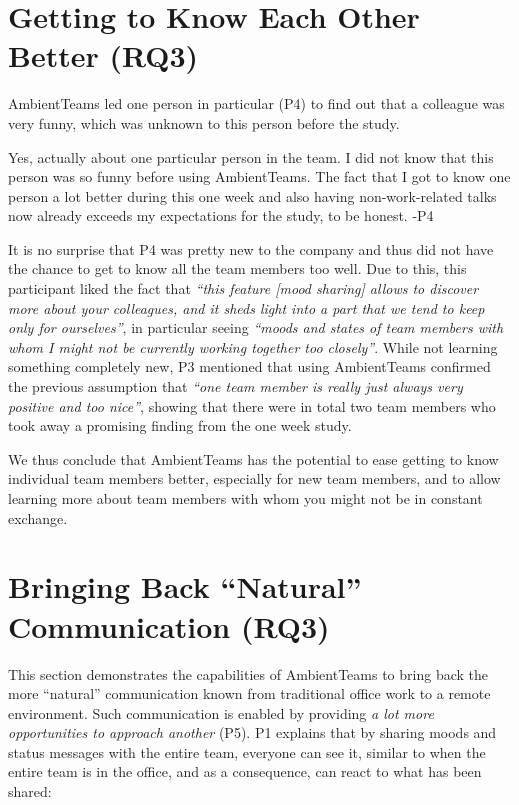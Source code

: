 \section{Getting to Know Each Other Better (RQ3)}
\label{section:getting_to_know_each_other_better}
AmbientTeams led one person in particular (P4) to find out that a colleague was very funny, which was unknown to this person before the study.

\begin{displayquote}
    Yes, actually about one particular person in the team. I did not know that this person was so funny before using AmbientTeams. The fact that I got to know one person a lot better during this one week and also having non-work-related talks now already exceeds my expectations for the study, to be honest. -P4
\end{displayquote}

It is no surprise that P4 was pretty new to the company and thus did not have the chance to get to know all the team members too well. Due to this, this participant liked the fact that \textit{\enquote{this feature [mood sharing] allows to discover more about your colleagues, and it sheds light into a part that we tend to keep only for ourselves}}, in particular seeing \textit{\enquote{moods and states of team members with whom I might not be currently working together too closely}}.  While not learning something completely new, P3 mentioned that using AmbientTeams confirmed the previous assumption that \textit{\enquote{one team member is really just always very positive and too nice}}, showing that there were in total two team members who took away a promising finding from the one week study.

We thus conclude that AmbientTeams has the potential to ease getting to know individual team members better, especially for new team members, and to allow learning more about team members with whom you might not be in constant exchange.


\section{Bringing Back \enquote{Natural} Communication (RQ3)}
\label{section:bringing_back_natural_communication}
This section demonstrates the capabilities of AmbientTeams to bring back the more \enquote{natural} communication known from traditional office work to a remote environment. Such communication is enabled by providing \textit{a lot more opportunities to approach another} (P5). P1 explains that by sharing moods and status messages with the entire team, everyone can see it, similar to when the entire team is in the office, and as a consequence, can react to what has been shared:

